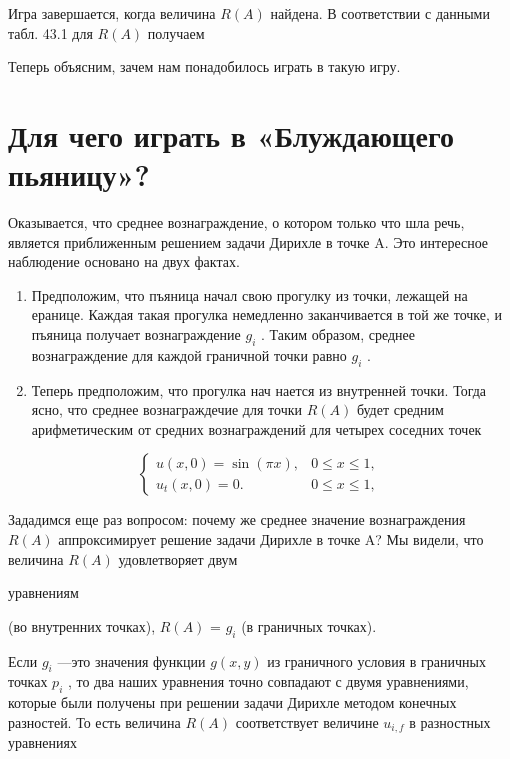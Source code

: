 \documentclass[
  ukrainian,
]{article}
\begin{document}
Игра завершается, когда величина \(R\left(A\right)\) найдена. В
соответствии с данными табл. 43.1 для \(R\left(A\right)\) получаем

Теперь объясним, зачем нам понадобилось играть в такую игру.

\section{Для чего играть в «Блуждающего
пьяницу»?}\label{ux434ux43bux44f-ux447ux435ux433ux43e-ux438ux433ux440ux430ux442ux44c-ux432-ux431ux43bux443ux436ux434ux430ux44eux449ux435ux433ux43e-ux43fux44cux44fux43dux438ux446ux443}

Оказывается, что среднее вознаграждение, о котором только что шла речь,
является приближенным решением задачи Дирихле в точке A. Это интересное
наблюдение основано на двух фактах.

\begin{enumerate}
\def\labelenumi{\arabic{enumi}.}
\item
  Предположим, что пъяница начал свою прогулку из точки, лежащей на
  еранице. Каждая такая прогулка немедленно заканчивается в той же
  точке, и пъяница получает вознаграждение \(g_i\) . Таким образом,
  среднее вознаграждение для каждой граничной точки равно \(g_i\) .
\item
  Теперь предположим, что прогулка нач нается из внутренней точки. Тогда
  ясно, что среднее вознаграждечие для точки \(R(A)\) будет средним
  арифметическим от средних вознаграждений для четырех соседних точек
\end{enumerate}

\[
\begin{cases} u(x, 0) = \sin(\pi x), & 0 \le x \le 1, \\ u_t(x, 0) = 0. & 0 \le x \le 1, \end{cases}
\]

Зададимся еще раз вопросом: почему же среднее значение вознаграждения
\(R(A)\) аппроксимирует решение задачи Дирихле в точке A? Мы видели, что
величина \(R(A)\) удовлетворяет двум

уравнениям

(во внутренних точках), \(R(A)\) = \(g_i\) (в граничных точках).

Если \(g_i\) ---это значения функции \(g(x, y)\) из граничного условия в
граничных точках \(p_i\) , то два наших уравнения точно совпадают с
двумя уравнениями, которые были получены при решении задачи Дирихле
методом конечных разностей. То есть величина \(R(A)\) соответствует
величине \(u_{i,f}\) в разностных уравнениях
\end{document}
